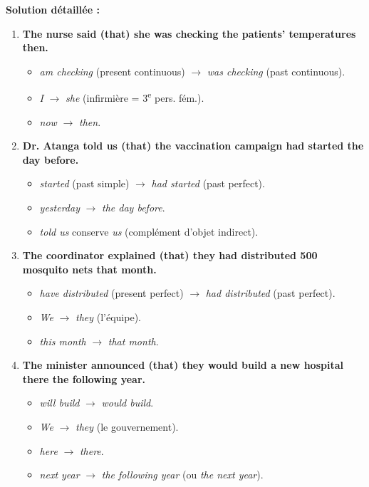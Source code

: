 \documentclass[11pt]{article}
\begin{document}
\begin{exoresolu}
\tcblower
\textbf{Solution détaillée :}
\begin{enumerate}
    \item \textbf{The nurse said (that) she was checking the patients' temperatures then.}
    \begin{itemize}
        \item \emph{am checking} (present continuous) $\rightarrow$ \emph{was checking} (past continuous).
        \item \emph{I} $\rightarrow$ \emph{she} (infirmière = 3\textsuperscript{e} pers. fém.).
        \item \emph{now} $\rightarrow$ \emph{then}.
    \end{itemize}
    \item \textbf{Dr. Atanga told us (that) the vaccination campaign had started the day before.}
    \begin{itemize}
        \item \emph{started} (past simple) $\rightarrow$ \emph{had started} (past perfect).
        \item \emph{yesterday} $\rightarrow$ \emph{the day before}.
        \item \emph{told us} conserve \emph{us} (complément d'objet indirect).
    \end{itemize}
    \item \textbf{The coordinator explained (that) they had distributed 500 mosquito nets that month.}
    \begin{itemize}
        \item \emph{have distributed} (present perfect) $\rightarrow$ \emph{had distributed} (past perfect).
        \item \emph{We} $\rightarrow$ \emph{they} (l'équipe).
        \item \emph{this month} $\rightarrow$ \emph{that month}.
    \end{itemize}
    \item \textbf{The minister announced (that) they would build a new hospital there the following year.}
    \begin{itemize}
        \item \emph{will build} $\rightarrow$ \emph{would build}.
        \item \emph{We} $\rightarrow$ \emph{they} (le gouvernement).
        \item \emph{here} $\rightarrow$ \emph{there}.
        \item \emph{next year} $\rightarrow$ \emph{the following year} (ou \emph{the next year}).

\end{itemize}
\end{enumerate}
\end{exoresolu}
\end{document}
